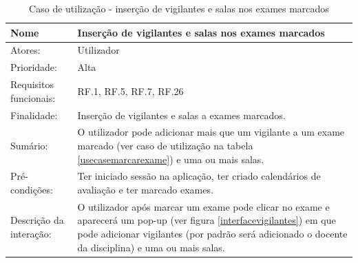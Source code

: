 \documentclass[11pt, twoside]{report}
\begin{document}
	\def\arraystretch{1.5}
	\begin{center}
		\begin{longtable}{|m{4cm}|m{12cm}|}
			\caption{Caso de utilização - inserção de vigilantes e salas nos exames marcados}\\
			
			\hline
			\textbf{Nome }              & \textbf{Inserção de vigilantes e salas nos exames marcados}                                                                                                                                                                      \\
			\hline
			Atores:                     & Utilizador                                                                                                                                                                                                                         \\
			\hline
			Prioridade:                 & Alta                                                                                                                                                                                                                               \\
			\hline
			Requisitos funcionais:      & RF.1, RF.5, RF.7, RF.26                                                                                                                                                                                                            \\
			\hline
			Finalidade:                 & Inserção de vigilantes e salas a exames marcados.                                                                                                                                                                                \\
			\hline
			Sumário:                   & O utilizador pode adicionar mais que um vigilante a um exame marcado (ver caso de utilização na tabela \ref{usecasemarcarexame}) e uma ou mais salas.                                                                            \\
			\hline
			Pré-condições:           & Ter iniciado sessão na aplicação, ter criado calendários de avaliação e ter marcado exames.                                                                                                                                  \\
			\hline 
			Descrição da interação: & O utilizador após marcar um exame pode clicar no exame e aparecerá um pop-up (ver figura \ref{interfacevigilantes}) em que pode adicionar vigilantes (por padrão será adicionado o docente da disciplina) e uma ou mais salas. \\

\end{longtable}
\end{center}
\end{document}

